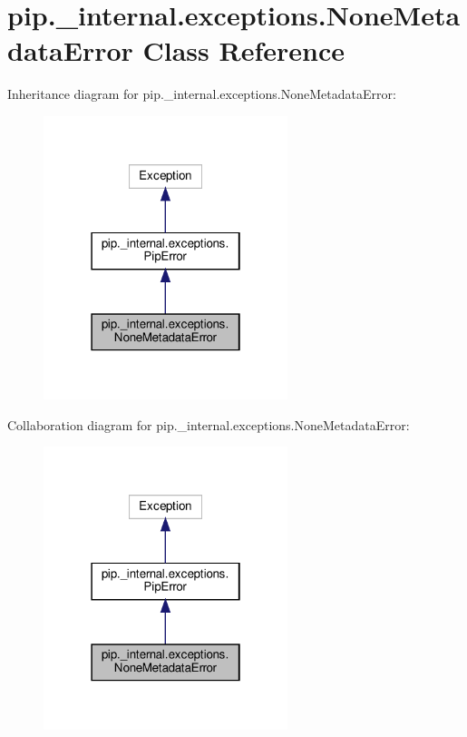 \hypertarget{classpip_1_1__internal_1_1exceptions_1_1NoneMetadataError}{}\section{pip.\+\_\+internal.\+exceptions.\+None\+Metadata\+Error Class Reference}
\label{classpip_1_1__internal_1_1exceptions_1_1NoneMetadataError}


Inheritance diagram for pip.\+\_\+internal.\+exceptions.\+None\+Metadata\+Error\+:
\nopagebreak
\begin{figure}[H]
\begin{center}
\leavevmode
\includegraphics[width=202pt]{classpip_1_1__internal_1_1exceptions_1_1NoneMetadataError__inherit__graph}
\end{center}
\end{figure}


Collaboration diagram for pip.\+\_\+internal.\+exceptions.\+None\+Metadata\+Error\+:
\nopagebreak
\begin{figure}[H]
\begin{center}
\leavevmode
\includegraphics[width=202pt]{classpip_1_1__internal_1_1exceptions_1_1NoneMetadataError__coll__graph}
\end{center}
\end{figure}
